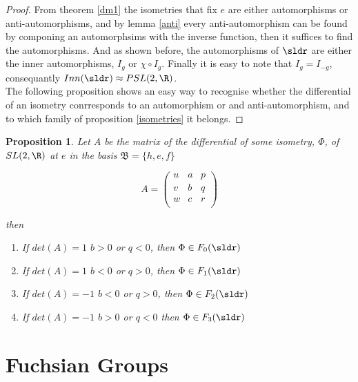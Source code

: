 \documentclass[11pt]{amsart}
\theoremstyle{plain}
\newtheorem{prop}[thm]{Proposition}
\theoremstyle{definition}
\theoremstyle{remark}
\begin{document}
\begin{proof}
From theorem \ref{dm1} the isometries that fix $e$ are either automorphisms or anti-automorphisms, and by lemma \ref{anti} every anti-automorphism can be found by componing an automorphsims with the inverse function, then it suffices to find the automorphisms. And as shown before, the automorphisms of $\sldr$ are either the inner automorphisms, $I_g$ or $\chi \circ I_g$. Finally it is easy to note that $I_g = I_{-g}$, consequantly $Inn(\sldr) \approx PSL(2,\R)$.\\

The following proposition shows an easy way to recognise whether the differential of an isometry conrresponds to an automorphism or and anti-automorphism, and to which family of proposition \ref{isometries} it belongs.

\end{proof}

\begin{prop}
Let $A$ be the matrix of the differential of some isometry, $\Phi$, of $SL(2,\R)$ at $e$ in the basis $\mathfrak{B}=\{ h,e,f \}$

\[A=\left( {\begin{array}{ccc}
   u & a & p \\
   v & b & q \\
   w & c & r \\
  \end{array} } \right)
\]

then

\begin{enumerate}
\item If $det(A)=1$ $b>0$ or $q<0$, then $\Phi \in F_0(\sldr)$ 
\item If $det(A)=1$ $b<0$ or $q>0$, then $\Phi \in F_1(\sldr)$ 
\item If $det(A)=-1$ $b<0$ or $q>0$, then $\Phi \in F_2(\sldr)$ 
\item If $det(A)=-1$ $b>0$ or $q<0$ then $\Phi \in F_3(\sldr)$ 
\end{enumerate}

\end{prop}

\section{Fuchsian Groups}
\end{document}
